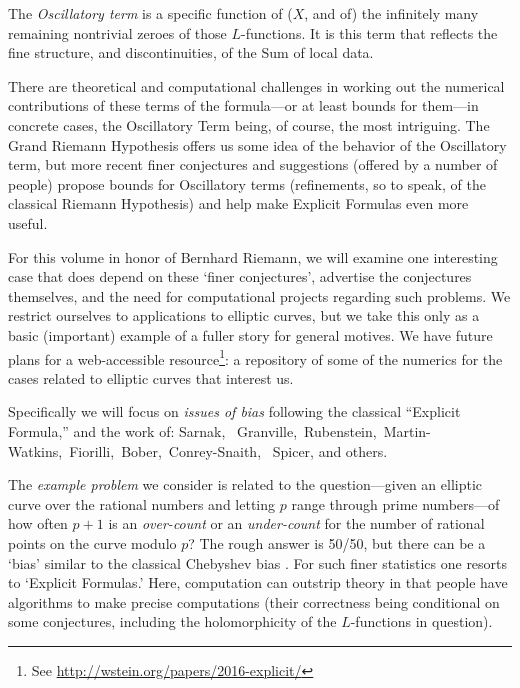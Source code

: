 \documentclass[11pt]{article}
\theoremstyle{plain}
\theoremstyle{definition}
\numberwithin{equation}{section}
\numberwithin{figure}{section}
\numberwithin{table}{section}
\begin{document}
 The {\it Oscillatory term} is  a specific function of ($X$, and of) the infinitely many remaining nontrivial zeroes of those $L$-functions. It is this term that reflects the fine structure, and discontinuities, of the Sum of local data.




 There are theoretical and computational challenges in working out the  numerical contributions of these terms of the formula---or at least bounds for them---in concrete cases, the Oscillatory Term being, of course, the most intriguing. The Grand Riemann Hypothesis offers us some idea of the behavior of the Oscillatory term, but more recent  finer conjectures and suggestions (offered by a number of people) propose bounds for Oscillatory terms  (refinements, so to speak, of the classical Riemann Hypothesis)  and help make Explicit Formulas  even more useful.

   For this volume in honor of Bernhard Riemann,  we will examine one interesting case  that does depend on these `finer conjectures',  advertise the conjectures themselves, and  the need for  computational projects regarding  such problems.  We restrict ourselves to applications to elliptic curves, but we take this only as a basic (important) example of a fuller story for general motives.  We have  future plans for a web-accessible resource\footnote{See \url{http://wstein.org/papers/2016-explicit/}}: a repository of some of the numerics for the cases related to elliptic curves that interest us.

  Specifically we will  focus on {\it issues of bias}  following the classical ``Explicit Formula,'' and the work of:
Sarnak, \ Granville,\  Rubenstein,\, Martin-Watkins,\ Fiorilli,\ Bober,\ Conrey-Snaith, \ Spicer, and others.


 The {\it example problem} we consider is related to the question---given an elliptic curve over the rational numbers and letting  $p$ range through prime numbers---of how often  $p+1$ is an {\it over-count} or an {\it under-count} for the number of rational points on the curve modulo $p$? The rough answer is 50/50, but there can be a `bias' similar to the classical Chebyshev bias  \cite{R-S}. For such finer statistics one resorts to `Explicit Formulas.'  Here, computation can  outstrip theory in that people have algorithms to make precise computations (their correctness being conditional on some conjectures, including the holomorphicity of the $L$-functions in question).
\end{document}
